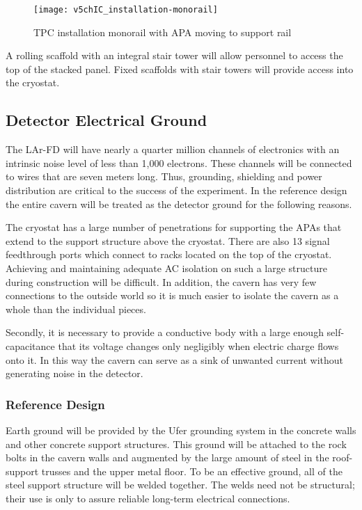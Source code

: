\begin{figure}[htpb]
\centering
\texttt{[image: v5chIC\_installation-monorail]}
\caption{TPC installation monorail with APA moving to support rail}
\label{fig:installation-monorail}
\end{figure}

A rolling scaffold with an integral stair tower will allow personnel to access the top of the stacked panel. Fixed scaffolds with stair towers will provide access into the cryostat. 

\subsection{Detector Electrical Ground}

The LAr-FD will have nearly a quarter million channels of electronics with an intrinsic noise level of less than 1,000 electrons.  These channels will be connected to wires that are seven meters long.  Thus, grounding, shielding and power distribution are critical to the success of the experiment. In the reference design the entire cavern will be treated as the detector ground for the following reasons.

The cryostat has a large number of penetrations for supporting the APAs that extend to the support structure above the cryostat.   There are also 13 signal feedthrough ports which connect to racks located on the top of the cryostat.  Achieving and maintaining adequate AC isolation on such a large structure during construction will be difficult.  In addition, the cavern has very few connections to the outside world so it is much easier to isolate the cavern as  a whole than the individual pieces.

Secondly, it is necessary to provide a conductive body with a large enough self-capacitance that its voltage changes only negligibly when electric charge flows onto it. In this way the cavern can serve as a sink of unwanted current without generating noise in the detector.   

\subsubsection{Reference Design}

Earth ground will be provided by the Ufer grounding system in the concrete walls and other concrete support structures.   This ground will be attached to the rock bolts in the cavern walls and augmented by the large amount of steel in the roof-support trusses and the upper metal floor.  To be an effective ground, all of the steel support structure will be welded together.  The welds need not be structural; their use is only to assure reliable long-term electrical connections.

